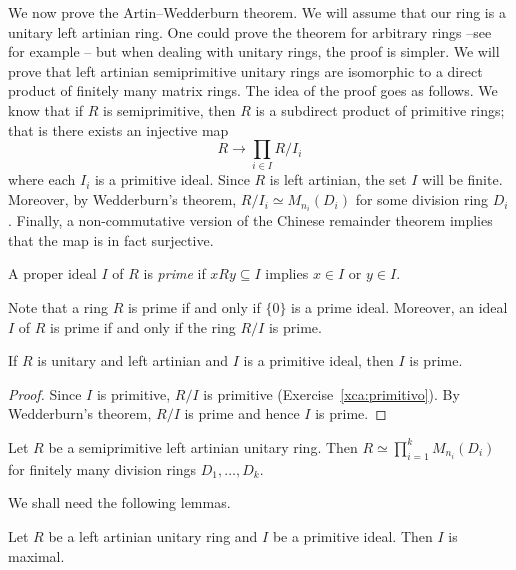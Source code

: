 We now prove the Artin--Wedderburn theorem. We will assume that our ring
is a unitary left artinian ring. One could prove the 
theorem for arbitrary rings --see for example \cite{MR600654}--  
but when dealing with unitary rings, the proof 
is simpler. We will prove
that left artinian semiprimitive unitary rings
are isomorphic to a direct product
of finitely many matrix rings. The idea of the proof goes as follows. 
We know that if 
$R$ is semiprimitive, then $R$ is a subdirect product
of primitive rings; that is  
there exists an injective map
\[
R\to \prod_{i\in I}R/I_i
\]
where each $I_i$ is a primitive ideal. Since $R$ is left artinian, 
the set $I$ will be finite. Moreover, 
by Wedderburn's theorem, 
$R/I_i\simeq M_{n_i}(D_i)$ for some division ring $D_i$. Finally,
a non-commutative version of the Chinese remainder theorem
implies that the map is in fact surjective. 

\begin{definition}
    A proper ideal $I$ of $R$ is \emph{prime} if $xRy\subseteq I$ implies
    $x\in I$ or $y\in I$.
\end{definition}

Note that a ring $R$ is prime if and only if $\{0\}$ is a prime ideal. 
Moreover, 
an ideal $I$ of $R$ is prime if and only if 
the ring $R/I$ is prime. 

\begin{lemma}
    If $R$ is unitary and left artinian and $I$ is a primitive ideal, then
    $I$ is prime. 
\end{lemma}

\begin{proof}
    Since $I$ is primitive, $R/I$ is primitive (Exercise~\ref{xca:primitivo}). By Wedderburn's theorem, 
    $R/I$ is prime and hence $I$ is prime. 
\end{proof}

\begin{theorem}
\label{thm:ArtinWedderburn_version2}
    Let $R$ be a semiprimitive left artinian unitary ring. Then
    $R\simeq\prod_{i=1}^kM_{n_i}(D_i)$ for finitely many
    division rings $D_1,\dots,D_k$. 
\end{theorem}

We shall need the following lemmas.

\begin{lemma}
\label{lem:primitive=>maximal}
    Let $R$ be a left artinian unitary ring and $I$ be a primitive ideal. 
    Then $I$ is maximal. 
\end{lemma}

